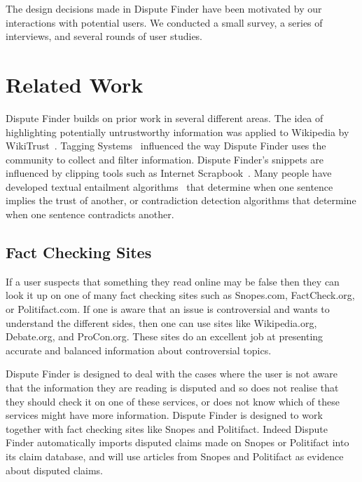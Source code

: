 \documentclass{www2010-submission}
\newcommand{\todo}[1]{}
\begin{document}
The design decisions made in Dispute Finder have been motivated by our interactions with potential users. We conducted a small survey, a series of interviews, and several rounds of user studies. 

\todo{Should we explicitly list what we think are our key contributions?}


\section{Related Work}

Dispute Finder builds on prior work in several different areas. The idea of highlighting potentially untrustworthy information was applied to Wikipedia by WikiTrust~\cite{Adler2008a}. Tagging Systems~\cite{Marlow2006} influenced the way Dispute Finder uses the community to collect and filter information. Dispute Finder's snippets are influenced by clipping tools such as Internet Scrapbook~\cite{Sugiura1998}. Many people have developed textual entailment algorithms~\cite{entail?} that determine when one sentence implies the trust of another, or contradiction detection algorithms that determine when one sentence contradicts another.

\todo{Add more references from the NewsCube paper}


\subsection{Fact Checking Sites}

If a user suspects that something they read online may be false then they can look it up on one of many fact checking sites such as Snopes.com, FactCheck.org, or Politifact.com. If one is aware that an issue is controversial and wants to understand the different sides, then one can use sites like Wikipedia.org, Debate.org, and ProCon.org. These sites do an excellent job at presenting accurate and balanced information about controversial topics. 

Dispute Finder is designed to deal with the cases where the user is not aware that the information they are reading is disputed and so does not realise that they should check it on one of these services, or does not know which of these services might have more information. Dispute Finder is designed to work together with fact checking sites like Snopes and Politifact. Indeed Dispute Finder automatically imports disputed claims made on Snopes or Politifact into its claim database, and will use articles from Snopes and Politifact as evidence about disputed claims.
\end{document}
